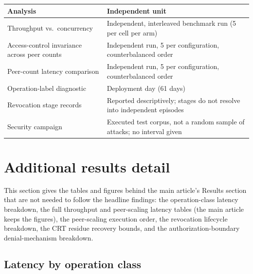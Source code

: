 \begin{widetab}
\caption{Experimental unit used for each analysis in the main article.}
\label{tab:units}
\small
\begin{tabularx}{\tblwidth}{@{}lX@{}}
\toprule
Analysis & Independent unit \\
\midrule
Throughput vs.\ concurrency &
  Independent, interleaved benchmark run (5 per cell per arm) \\
Access-control invariance across peer counts &
  Independent run, 5 per configuration, counterbalanced order \\
Peer-count latency comparison &
  Independent run, 5 per configuration, counterbalanced order \\
Operation-label diagnostic &
  Deployment day (61 days) \\
Revocation stage records &
  Reported descriptively; stages do not resolve into independent episodes \\
Security campaign &
  Executed test corpus, not a random sample of attacks; no interval given \\
\bottomrule
\end{tabularx}
\end{widetab}

\clearpage
\section{Additional results detail}
\label{sec:supp_results}

This section gives the tables and figures behind the main article's Results
section that are not needed to follow the headline findings: the
operation-class latency breakdown, the full throughput and peer-scaling
latency tables (the main article keeps the figures), the peer-scaling
execution order, the revocation lifecycle breakdown, the CRT residue
recovery bounds, and the authorization-boundary denial-mechanism breakdown.

\subsection{Latency by operation class}



\begin{widefig}
\centering
{}
\caption{Empirical latency distributions for the two committed transaction classes.}
\label{fig:cdf}
\end{widefig}

